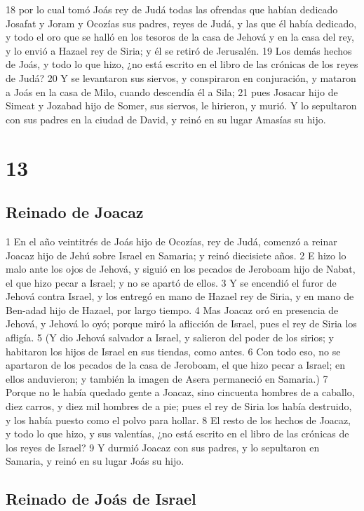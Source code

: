 18 por lo cual tomó Joás rey de Judá todas las ofrendas que habían dedicado Josafat y Joram y Ocozías sus padres, reyes de Judá, y las que él había dedicado, y todo el oro que se halló en los tesoros de la casa de Jehová y en la casa del rey, y lo envió a Hazael rey de Siria; y él se retiró de Jerusalén.
19 Los demás hechos de Joás, y todo lo que hizo, ¿no está escrito en el libro de las crónicas de los reyes de Judá?
20 Y se levantaron sus siervos, y conspiraron en conjuración, y mataron a Joás en la casa de Milo, cuando descendía él a Sila;
21 pues Josacar hijo de Simeat y Jozabad hijo de Somer, sus siervos, le hirieron, y murió. Y lo sepultaron con sus padres en la ciudad de David, y reinó en su lugar Amasías su hijo.

\chapter{13}

\section*{Reinado de Joacaz}

1 En el año veintitrés de Joás hijo de Ocozías, rey de Judá, comenzó a reinar Joacaz hijo de Jehú sobre Israel en Samaria; y reinó diecisiete años.
2 E hizo lo malo ante los ojos de Jehová, y siguió en los pecados de Jeroboam hijo de Nabat, el que hizo pecar a Israel; y no se apartó de ellos.
3 Y se encendió el furor de Jehová contra Israel, y los entregó en mano de Hazael rey de Siria, y en mano de Ben-adad hijo de Hazael, por largo tiempo.
4 Mas Joacaz oró en presencia de Jehová, y Jehová lo oyó; porque miró la aflicción de Israel, pues el rey de Siria los afligía.
5 (Y dio Jehová salvador a Israel, y salieron del poder de los sirios; y habitaron los hijos de Israel en sus tiendas, como antes.
6 Con todo eso, no se apartaron de los pecados de la casa de Jeroboam, el que hizo pecar a Israel; en ellos anduvieron; y también la imagen de Asera permaneció en Samaria.)
7 Porque no le había quedado gente a Joacaz, sino cincuenta hombres de a caballo, diez carros, y diez mil hombres de a pie; pues el rey de Siria los había destruido, y los había puesto como el polvo para hollar.
8 El resto de los hechos de Joacaz, y todo lo que hizo, y sus valentías, ¿no está escrito en el libro de las crónicas de los reyes de Israel?
9 Y durmió Joacaz con sus padres, y lo sepultaron en Samaria, y reinó en su lugar Joás su hijo.

\section*{Reinado de Joás de Israel}

